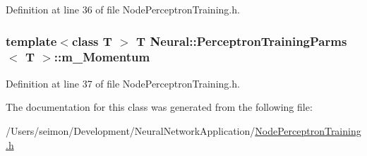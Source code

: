 Definition at line 36 of file NodePerceptronTraining.h.

\hypertarget{class_neural_1_1_perceptron_training_parms_a5db93fd54c981bfb758c8be32834df49}{
\subsubsection[{m\_\-Momentum}]{\setlength{\rightskip}{0pt plus 5cm}template$<$class T $>$ T {\bf Neural::PerceptronTrainingParms}$<$ T $>$::{\bf m\_\-Momentum}}}
\label{class_neural_1_1_perceptron_training_parms_a5db93fd54c981bfb758c8be32834df49}


Definition at line 37 of file NodePerceptronTraining.h.



The documentation for this class was generated from the following file:\begin{DoxyCompactItemize}
\item 
/Users/seimon/Development/NeuralNetworkApplication/\hyperlink{_node_perceptron_training_8h}{NodePerceptronTraining.h}\end{DoxyCompactItemize}
